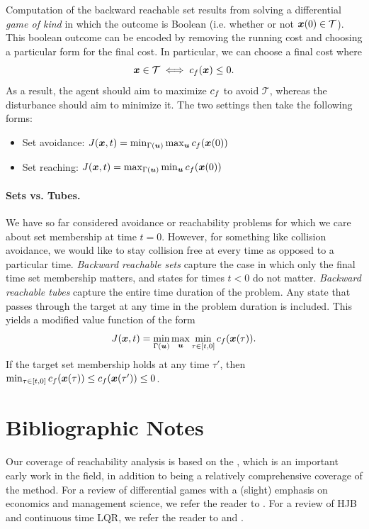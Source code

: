 Computation of the backward reachable set results from solving a differential \textit{game of kind} in which the outcome is Boolean (i.e. whether or not $\bm{x}(0) \in \mathcal{T}$). This boolean outcome can be encoded by removing the running cost and choosing a particular form for the final cost. In particular, we can choose a final cost where
\begin{equation}
    \bm{x} \in \mathcal{T} \iff c_f(\bm{x}) \leq 0.
\end{equation}
As a result, the agent should aim to maximize $c_f$ to avoid $\mathcal{T}$, whereas the disturbance should aim to minimize it. The two settings then take the following forms:
\begin{itemize}
    \item Set avoidance: $J(\bm{x},t) = \min_{\Gamma(\bm{u})} \max_{\bm{u}} c_f(\bm{x}(0))$
    \item Set reaching: $J(\bm{x},t) = \max_{\Gamma(\bm{u})} \min_{\bm{u}} c_f(\bm{x}(0))$
\end{itemize}

\paragraph{Sets vs. Tubes.} We have so far considered avoidance or reachability problems for which we care about set membership at time $t=0$. However, for something like collision avoidance, we would like to stay collision free at every time as opposed to a particular time. \textit{Backward reachable sets} capture the case in which only the final time set membership matters, and states for times $t<0$ do not matter. \textit{Backward reachable tubes} capture the entire time duration of the problem. Any state that passes through the target at any time in the problem duration is included. This yields a modified value function of the form
\begin{equation}
    J(\bm{x},t) = \min_{\Gamma(\bm{u})} \max_{\bm{u}} \min_{\tau \in [t,0]} c_f(\bm{x}(\tau)).
\end{equation}
If the target set membership holds at any time $\tau'$, then $\min_{\tau\in[t,0]} c_f(\bm{x}(\tau)) \leq c_f(\bm{x}(\tau')) \leq 0$.

\section{Bibliographic Notes}

Our coverage of reachability analysis is based on the \cite{mitchell2005time}, which is an important early work in the field, in addition to being a relatively comprehensive coverage of the method. For a review of differential games with a (slight) emphasis on economics and management science, we refer the reader to \cite{bressan2010noncooperative}. For a review of HJB and continuous time LQR, we refer the reader to \cite{bertsekas1995dynamic} and \cite{kirk2012optimal}.

